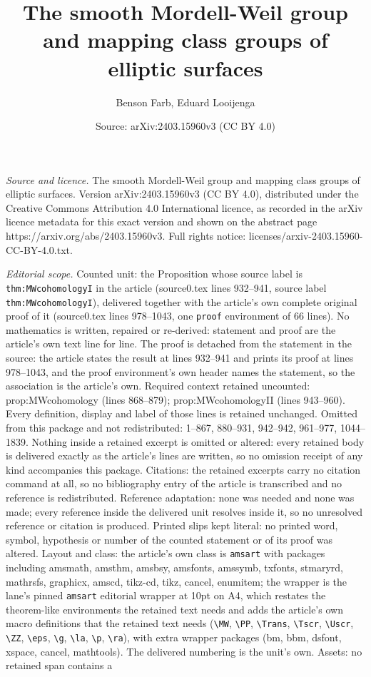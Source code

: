 \documentclass[10pt,a4paper]{amsart}
\title[The smooth Mordell-Weil group and mapping class groups of el]{The smooth Mordell-Weil group and mapping class groups of elliptic surfaces}
\author{Benson Farb, Eduard Looijenga}
\date{Source: arXiv:2403.15960v3 (CC BY 4.0)}
\begin{document}
\maketitle

\noindent\emph{Source and licence.} The smooth Mordell-Weil group and mapping class groups of elliptic surfaces. Version arXiv:2403.15960v3 (CC BY 4.0), distributed under the Creative Commons Attribution 4.0 International licence, as recorded in the arXiv licence metadata for this exact version and shown on the abstract page https://arxiv.org/abs/2403.15960v3. Full rights notice: licenses/arxiv-2403.15960-CC-BY-4.0.txt.\par\smallskip

\noindent\textit{Editorial scope.} Counted unit: the Proposition whose source label is \texttt{thm:MWcohomologyI} in the article (source0.tex lines 932--941, source label \texttt{thm:MWcohomologyI}), delivered together with the article's own complete original proof of it (source0.tex lines 978--1043, one \texttt{proof} environment of 66 lines). No mathematics is written, repaired or re-derived: statement and proof are the article's own text line for line. The proof is detached from the statement in the source: the article states the result at lines 932--941 and prints its proof at lines 978--1043, and the proof environment's own header names the statement, so the association is the article's own. Required context retained uncounted: prop:MWcohomology (lines 868--879); prop:MWcohomologyII (lines 943--960). Every definition, display and label of those lines is retained unchanged. Omitted from this package and not redistributed: 1--867, 880--931, 942--942, 961--977, 1044--1839. Nothing inside a retained excerpt is omitted or altered: every retained body is delivered exactly as the article's lines are written, so no omission receipt of any kind accompanies this package. Citations: the retained excerpts carry no citation command at all, so no bibliography entry of the article is transcribed and no reference is redistributed. Reference adaptation: none was needed and none was made; every reference inside the delivered unit resolves inside it, so no unresolved reference or citation is produced. Printed slips kept literal: no printed word, symbol, hypothesis or number of the counted statement or of its proof was altered. Layout and class: the article's own class is \texttt{amsart} with packages including amsmath, amsthm, amsbsy, amsfonts, amssymb, txfonts, stmaryrd, mathrsfs, graphicx, amscd, tikz-cd, tikz, cancel, enumitem; the wrapper is the lane's pinned \texttt{amsart} editorial wrapper at 10pt on A4, which restates the theorem-like environments the retained text needs and adds the article's own macro definitions that the retained text needs (\texttt{\textbackslash MW}, \texttt{\textbackslash PP}, \texttt{\textbackslash Trans}, \texttt{\textbackslash Tscr}, \texttt{\textbackslash Uscr}, \texttt{\textbackslash ZZ}, \texttt{\textbackslash eps}, \texttt{\textbackslash g}, \texttt{\textbackslash la}, \texttt{\textbackslash p}, \texttt{\textbackslash ra}), with extra wrapper packages (bm, bbm, dsfont, xspace, cancel, mathtools). The delivered numbering is the unit's own. Assets: no retained span contains a 
\end{document}
